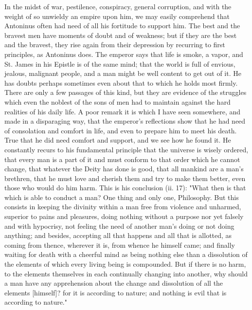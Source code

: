 In the midst of war, pestilence, conspiracy, general corruption, and with the weight of so unwieldy an empire upon him, we may easily comprehend that Antoninus often had need of all his fortitude to support him. The best and the bravest men have moments of doubt and of weakness; but if they are the best and the bravest, they rise again from their depression by recurring to first principles, as Antoninus does. The emperor says that life is smoke, a vapor, and St. James in his Epistle is of the same mind; that the world is full of envious, jealous, malignant people, and a man might be well content to get out of it. He has doubts perhaps sometimes even about that to which he holds most firmly. There are only a few passages of this kind, but they are evidence of the struggles which even the noblest of the sons of men had to maintain against the hard realities of his daily life. A poor remark it is which I have seen somewhere, and made in a disparaging way, that the emperor's reflections show that he had need of consolation and comfort in life, and even to prepare him to meet his death. True that he did need comfort and support, and we see how he found it. He constantly recurs to his fundamental principle that the universe is wisely ordered, that every man is a part of it and must conform to that order which he cannot change, that whatever the Deity has done is good, that all mankind are a man's brethren, that he must love and cherish them and try to make them better, even those who would do him harm. This is his conclusion (ii. 17): "What then is that which is able to conduct a man? One thing and only one, Philosophy. But this consists in keeping the divinity within a man free from violence and unharmed, superior to pains and pleasures, doing nothing without a purpose nor yet falsely and with hypocrisy, not feeling the need of another man's doing or not doing anything; and besides, accepting all that happens and all that is allotted, as coming from thence, wherever it is, from whence he himself came; and finally waiting for death with a cheerful mind as being nothing else than a dissolution of the elements of which every living being is compounded. But if there is no harm, to the elements themselves in each continually changing into another, why should a man have any apprehension about the change and dissolution of all the elements [himself]? for it is according to nature; and nothing is evil that is according to nature."

